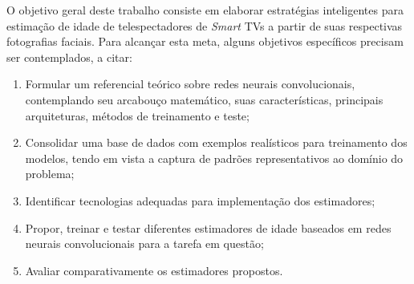 O objetivo geral deste trabalho consiste em elaborar estratégias inteligentes para estimação de idade de telespectadores de  \emph{Smart} TVs a partir de suas respectivas fotografias faciais. Para alcançar esta meta, alguns objetivos específicos precisam ser contemplados, a citar:

\begin{enumerate}
     \item Formular um referencial teórico sobre redes neurais convolucionais, contemplando seu arcabouço matemático, suas características, principais arquiteturas, métodos de treinamento e teste;
     \item Consolidar uma base de dados com exemplos realísticos para treinamento dos modelos, tendo em vista a captura de padrões representativos ao domínio do problema;
     \item Identificar tecnologias adequadas para implementação dos estimadores;
     \item Propor, treinar e testar diferentes estimadores de idade baseados em redes neurais convolucionais para a tarefa em questão;
     \item Avaliar comparativamente os estimadores propostos.
\end{enumerate}
